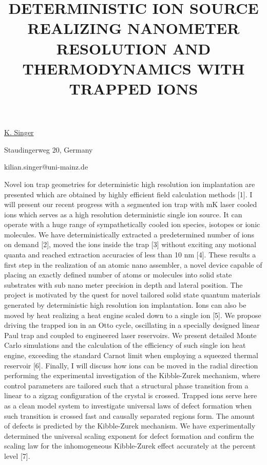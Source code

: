 \title{DETERMINISTIC ION SOURCE REALIZING NANOMETER RESOLUTION AND THERMODYNAMICS WITH TRAPPED IONS}

\underline{K. Singer} 

{\normalsize{\vspace{-4mm}}
Staudingerweg 20, Germany

\email kilian.singer@uni-mainz.de}

Novel ion trap geometries for deterministic high resolution ion
implantation are presented which are obtained by highly efficient field
 calculation methods [1]. I will present our recent progress with a
segmented ion trap with mK laser cooled ions which serves as a high
resolution deterministic single ion source. It can operate with a huge
range of sympathetically cooled ion species, isotopes or ionic
molecules. We have deterministically extracted a predetermined number of
ions on demand [2], moved the ions inside the trap [3] without exciting
any motional quanta and reached extraction accuracies of less than 10 nm [4].
These results a first step in the realization of an atomic nano
assembler, a novel device capable of placing an exactly defined number
of atoms or molecules into solid state substrates with sub nano meter
precision in depth and lateral position. The project is motivated by the
quest for novel tailored solid state quantum materials generated by
deterministic high resolution ion implantation. Ions can also be moved
by heat realizing a heat engine scaled down to a single ion [5]. We
propose driving the trapped ion in an Otto cycle, oscillating in a
specially designed linear Paul trap and coupled to engineered laser
reservoirs. We present detailed Monte Carlo simulations and the
calculation of the efficiency of such single ion heat engine, exceeding
the standard Carnot limit when employing a squeezed thermal reservoir
[6]. Finally, I will discuss how ions can be moved in the radial
direction performing the experimental investigation of the Kibble-Zurek
mechanism, where control parameters are tailored such that a structural
phase transition from a linear to a zigzag configuration of the crystal
is crossed. Trapped ions serve here as a clean model system to
investigate universal laws of defect formation when such transition is
crossed fast and causally separated regions form. The amount of defects
is predicted by the Kibble-Zurek mechanism. We have experimentally
determined the universal scaling exponent for defect formation and
confirm the scaling law for the inhomogeneous Kibble-Zurek effect
accurately at the percent level [7].

